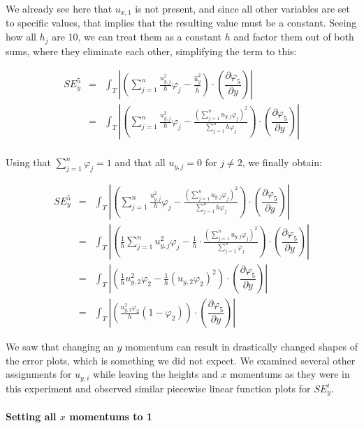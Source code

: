 \documentclass{article}
\newcommand{\pd}[2]{\dfrac{\partial #1}{\partial #2}}
\renewcommand{\phi}{\varphi}
\begin{document}
We already see here that $u_{x,1}$ is not present, and since all other variables are set to specific values, that implies that the resulting value must be a constant. Seeing how all $h_j$ are 10, we can treat them as a constant $h$ and factor them out of both sums, where they eliminate each other, simplifying the term to this:

\begin{eqnarray*}
  SE_y^5 & = & \int_T \left| \left( \sum_{j=1}^n \frac{u_{y,j}^2}{h} \phi_j - \frac{\widehat{u}_y^2}{\widehat{h}} \right) \cdot \left(\pd{\phi_5}{y}\right) \right| \\
  {} & = & \int_T \left| \left( \sum_{j=1}^n \frac{u_{y,j}^2}{h} \phi_j - \frac{\left(\sum_{j=1}^n u_{y,j}\phi_j\right)^2}{\sum_{j=1}^n h\phi_j} \right) \cdot \left(\pd{\phi_5}{y}\right) \right| \\
\end{eqnarray*}

Using that $\sum_{j=1}^n \phi_j = 1$ and that all $u_{y,j} = 0$ for $j \neq 2$, we finally obtain:

\begin{eqnarray*}
  SE_y^5 & = & \int_T \left| \left( \sum_{j=1}^n \frac{u_{y,j}^2}{h} \phi_j - \frac{\left(\sum_{j=1}^n u_{y,j}\phi_j\right)^2}{\sum_{j=1}^n h\phi_j} \right) \cdot \left(\pd{\phi_5}{y}\right) \right| \\
  {} & = & \int_T \left| \left( \frac{1}{h} \sum_{j=1}^n u_{y,j}^2 \phi_j - \frac{1}{h} \cdot \frac{\left(\sum_{j=1}^n u_{y,j}\phi_j\right)^2}{\sum_{j=1}^n \phi_j} \right) \cdot \left(\pd{\phi_5}{y}\right) \right| \\
{} & = & \int_T \left| \left( \frac{1}{h} u_{y,2}^2 \phi_2 - \frac{1}{h} \left(u_{y,2}\phi_2\right)^2 \right) \cdot \left(\pd{\phi_5}{y}\right) \right| \\
	{} & = & \int_T \left| \left( \frac{u_{y,2}^2 \phi_2}{h} \left( 1 - \phi_2\right) \right) \cdot \left(\pd{\phi_5}{y}\right) \right|
\end{eqnarray*}

We saw that changing an $y$ momentum can result in drastically changed shapes of the error plots,  which is something we did not expect. We examined several other assignments for $u_{y,i}$ while leaving the heights and $x$ momentums as they were in this experiment and observed similar piecewise linear function plots for $SE_y^i$.

\paragraph{Setting all $x$ momentums to 1}
\end{document}
